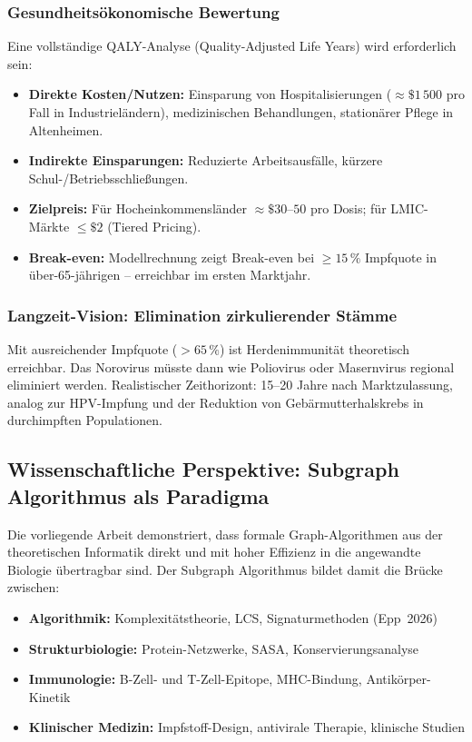 ﻿\documentclass[a4paper,12pt]{article}
\theoremstyle{plain}
\theoremstyle{definition}
\theoremstyle{remark}
\begin{document}
\subsubsection{Gesundheitsökonomische Bewertung}

Eine vollständige QALY-Analyse (Quality-Adjusted Life Years) wird erforderlich sein:

\begin{itemize}
  \item \textbf{Direkte Kosten/Nutzen:} Einsparung von Hospitalisierungen ($\approx\!
        \$1\,500$ pro Fall in Industrieländern), medizinischen Behandlungen,
        stationärer Pflege in Altenheimen.
  \item \textbf{Indirekte Einsparungen:} Reduzierte Arbeitsausfälle, kürzere
        Schul-/Betriebsschließungen.
  \item \textbf{Zielpreis:} Für Hocheinkommensländer $\approx\$30$--$50$ pro Dosis;
        für LMIC-Märkte $\leq\$2$ (Tiered Pricing).
  \item \textbf{Break-even:} Modellrechnung zeigt Break-even bei $\geq15\,\%$
        Impfquote in über-65-jährigen -- erreichbar im ersten Marktjahr.
\end{itemize}

\subsubsection{Langzeit-Vision: Elimination zirkulierender Stämme}

Mit ausreichender Impfquote ($>65\,\%$) ist Herdenimmunität theoretisch erreichbar.
Das Norovirus müsste dann wie Poliovirus oder Masernvirus regional eliminiert werden.
Realistischer Zeithorizont: 15--20 Jahre nach Marktzulassung, analog zur HPV-Impfung
und der Reduktion von Gebärmutterhalskrebs in durchimpften Populationen.

\subsection{Wissenschaftliche Perspektive: Subgraph Algorithmus als Paradigma}

Die vorliegende Arbeit demonstriert, dass formale Graph-Algorithmen aus der
theoretischen Informatik direkt und mit hoher Effizienz in die angewandte Biologie
übertragbar sind. Der Subgraph Algorithmus bildet damit die Brücke zwischen:

\begin{itemize}
  \item \textbf{Algorithmik:} Komplexitätstheorie, LCS, Signaturmethoden (Epp~2026)
  \item \textbf{Strukturbiologie:} Protein-Netzwerke, SASA, Konservierungsanalyse
  \item \textbf{Immunologie:} B-Zell- und T-Zell-Epitope, MHC-Bindung, Antikörper-Kinetik
  \item \textbf{Klinischer Medizin:} Impfstoff-Design, antivirale Therapie, klinische Studien
\end{itemize}
\end{document}
